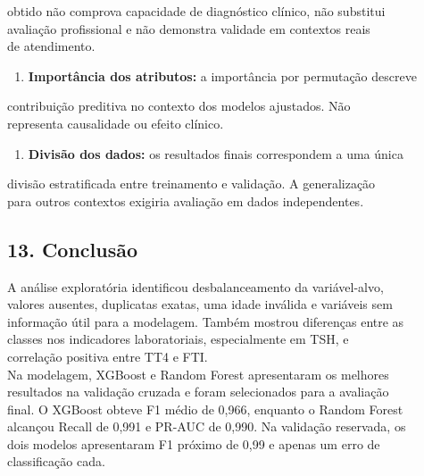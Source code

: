 \documentclass{article}
\begin{document}
obtido não comprova capacidade de diagnóstico clínico, não substitui \\
avaliação profissional e não demonstra validade em contextos reais \\
de atendimento. \\
\begin{enumerate}
  \item  \textbf{Importância dos atributos:} a importância por permutação descreve
\end{enumerate}
contribuição preditiva no contexto dos modelos ajustados. Não \\
representa causalidade ou efeito clínico. \\
\begin{enumerate}
  \item  \textbf{Divisão dos dados:} os resultados finais correspondem a uma única
\end{enumerate}
divisão estratificada entre treinamento e validação. A generalização \\
para outros contextos exigiria avaliação em dados independentes. \\

\subsection{13. Conclusão}

A análise exploratória identificou desbalanceamento da variável-alvo, \\
valores ausentes, duplicatas exatas, uma idade inválida e variáveis sem \\
informação útil para a modelagem. Também mostrou diferenças entre as \\
classes nos indicadores laboratoriais, especialmente em TSH, e \\
correlação positiva entre TT4 e FTI. \\

Na modelagem, XGBoost e Random Forest apresentaram os melhores \\
resultados na validação cruzada e foram selecionados para a avaliação \\
final. O XGBoost obteve F1 médio de 0,966, enquanto o Random Forest \\
alcançou Recall de 0,991 e PR-AUC de 0,990. Na validação reservada, os \\
dois modelos apresentaram F1 próximo de 0,99 e apenas um erro de \\
classificação cada. \\
\end{document}
